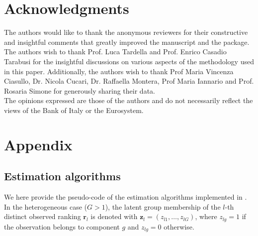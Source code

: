 \section{Acknowledgments}
The authors would like to thank the anonymous
reviewers for their constructive and insightful comments that greatly
improved the manuscript and the package. The authors wish to thank Prof. Luca Tardella and Prof. Enrico Casadio Tarabusi for the insightful discussions on various aspects of the methodology used in this paper. Additionally, the authors wish to thank Prof Maria Vincenza Ciasullo, Dr. Nicola Cucari, Dr. Raffaella Montera, Prof Maria Iannario and Prof. Rosaria Simone for generously sharing their data. \\ The opinions expressed are those of the authors and do not necessarily reflect the views of the Bank of Italy or the Eurosystem.

\appendix
\renewenvironment{example}{\itshape \small \begin{quote}}{\end{quote}}

\section{Appendix}
\label{sec:appendix}

\subsection{Estimation algorithms}
\label{app:Algo}
We here provide the pseudo-code of the estimation algorithms implemented in . In the heterogeneous case ($G>1$), the latent group membership of the $l$-th distinct observed ranking $\bm{r}_l$ is denoted with $\bm z_l = (z_{l1},\dots, z_{lG})$, where $z_{lg} = 1$ if the observation belongs to component $g$ and $z_{lg} = 0$ otherwise.

